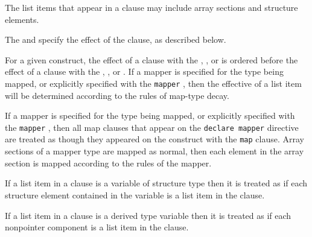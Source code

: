 \descr
The list items that appear in a  clause may include array sections and structure elements.



The  and  specify the effect of the  clause, as described below.

For a given construct, the effect of a  clause with the ,
, or   is ordered before the effect of a
 clause with the , , or 
. If a mapper is specified for the type being mapped, or
explicitly specified with the \verb`mapper` , then the
effective  of a list item will be determined according to the
rules of map-type decay.

If a mapper is specified for the type being mapped, or explicitly specified with
the \verb`mapper` , then all map clauses that appear on the
\verb`declare mapper` directive are treated as though they appeared on the
construct with the \verb`map` clause.  Array sections of a mapper type are
mapped as normal, then each element in the array section is mapped according to
the rules of the mapper.

\begin{ccppspecific}
If a list item in a  clause is a variable of structure type then it
is treated as if each structure element contained in the variable is a list
item in the clause.
\end{ccppspecific}

\begin{fortranspecific}
If a list item in a  clause is a derived type variable
then it is treated as if each nonpointer component is a list item in
the clause.
\end{fortranspecific}

